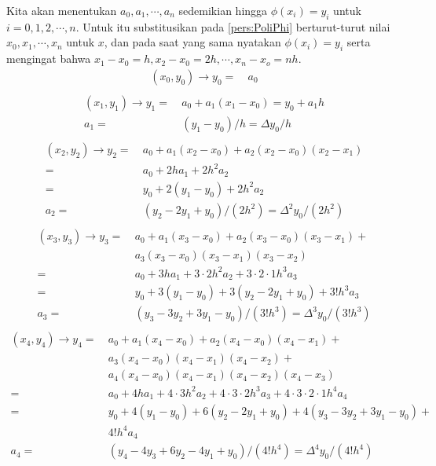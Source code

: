 Kita akan menentukan $a_0, a_1, \cdots, a_n$ sedemikian hingga $\phi(x_i) = y_i$ untuk $i = 0, 1, 2, \cdots, n$. Untuk itu substitusikan pada \ref{pers:PoliPhi} berturut-turut nilai $x_0,x_1,\cdots,x_n$ untuk $x$, dan pada saat yang sama nyatakan $\phi(x_i) = y_i$ serta mengingat bahwa $x_1-x_0 = h, x_2-x_0 = 2h, \cdots, x_n-x_o=nh$.
\begin{equation*}
\begin{split}
(x_0, y_0) \rightarrow y_0 =~& a_0\\
\end{split}
\end{equation*}
\begin{equation*}
\begin{split}
(x_1, y_1) \rightarrow y_1 =~& a_0 + a_1(x_1 - x_0) = y_0 + a_1h\\
a_1 =~& (y_1 - y_0)/h = \Delta y_0 / h\\
\end{split}
\end{equation*}
\begin{equation*}
\begin{split}
(x_2, y_2) \rightarrow y_2 =~& a_0 + a_1(x_2 - x_0) + a_2(x_2-x_0)(x_2-x_1)\\
=~& a_0 + 2ha_1 + 2h^2a_2\\
=~& y_0 + 2(y_1-y_0) + 2h^2a_2\\
a_2 =~& (y_2-2y_1+y_0)/(2h^2) = \Delta^2y_0/(2h^2)\\
\end{split}
\end{equation*}
\begin{equation*}
\begin{split}
(x_3, y_3) \rightarrow y_3 =~& a_0 + a_1(x_3-x_0) + a_2(x_3-x_0)(x_3-x_1) +\\
&a_3(x_3-x_0)(x_3-x_1)(x_3-x_2)\\
=~& a_0 + 3ha_1 + 3\cdot2h^2a_2 + 3\cdot2\cdot1 h^3a_3\\
=~& y_0 + 3(y_1-y_0) + 3(y_2-2y_1+y_0) + 3!h^3a_3\\
a_3 =~& (y_3 - 3y_2 + 3y_1 - y_0)/(3!h^3) = \Delta^3y_0/(3!h^3)\\
\end{split}
\end{equation*}
\begin{equation*}
\begin{split}
(x_4,y_4) \rightarrow y_4 =~& a_0 + a_1(x_4-x_0) + a_2(x_4-x_0)(x_4-x_1) +\\
&a_3(x_4-x_0)(x_4-x_1)(x_4-x_2) +\\
&a_4(x_4-x_0)(x_4-x_1)(x_4-x_2)(x_4-x_3)\\
=~&a_0 + 4ha_1 + 4\cdot3h^2a_2 + 4\cdot3\cdot2h^3a_3 + 4\cdot3\cdot2\cdot1h^4a_4\\
=~&y_0 +4(y_1-y_0) + 6(y_2-2y_1+y_0) + 4(y_3-3y_2+3y_1-y_0) +\\
& 4!h^4a_4\\
a_4 =~& (y_4 - 4y_3 + 6y_2 - 4y_1 + y_0)/(4!h^4) = \Delta^4y_0/(4!h^4)
\end{split}
\end{equation*}

